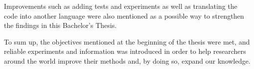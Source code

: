 Improvements such as adding tests and experiments as well as translating the code into another language were also mentioned as a possible way to strengthen the findings in this Bachelor's Thesis. \par

To sum up, the objectives mentioned at the beginning of the thesis were met, and reliable experiments and information was introduced in order to help researchers around the world improve their methods and, by doing so, expand our knowledge.